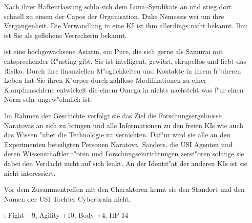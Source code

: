 Nach ihrer Haftentlassung schlo\3 sich   dem Luna--Syndikats an und stieg dort schnell zu einem der Capos der Organisation. Duke Nemessis wei\3 um ihre Vergangenheit. Die Verwandlung in eine KI ist ihm allerdings nicht bekannt. Ihm ist Sie als geflohene Verrecherin bekannt.

  ist eine hochgewachsene Asiatin, ein Pure, die sich gerne als Samurai mit entsprechender R"usting gibt. Sie ist intelligent, gewitzt, skrupellos und liebt das Risiko. Durch ihre finanziellen M"oglichkeiten und Kontakte in ihrem fr"uheren Leben hat Sie ihren K"orper durch zahllose Modifikationen zu einer Kampfmaschiene entwickelt die einem Omega in nichts nachsteht was f"ur einen Norm sehr ungew"ohnlich ist.

Im Rahmen der Geschichte verfolgt sie das Ziel die Forschungsergebnisse Naratovas an sich zu bringen und alle Informationen zu den freien KIs wie auch das Wissen "uber die Technologie zu vernichten. Daf"ur wird sie alle an den Experimenten beteiligten Personen Naratova, Sanders, die USI Agenten und deren Wissenschaftler t"oten und Forschungseinrichtungen zerst"oren solange sie dabei den Verdacht nicht auf sich lenkt. An der Identit"at der anderen KIs ist sie nicht interessiert.

Vor dem Zusammentreffen mit den Charakteren kennt sie den Standort und den Namen der USI Tochter Cyberbrain nicht.

  : Fight +9, Agility +10, Body +4, HP 14
